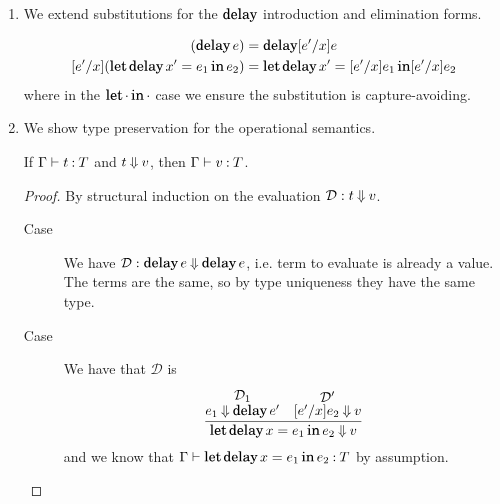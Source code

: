 \documentclass[11pt,letterpaper]{article}
\DeclareMathOperator{\LetOp}{\mathqd{let}}
\DeclareMathOperator{\InOp}{\mathqd{in}}
\newcommand{\Let}[2]{\LetOp #1 \InOp #2}
\DeclareMathOperator{\DelayOp}{\mathqd{delay}}
\newcommand{\delay}{\DelayOp}
\DeclareMathOperator{\ForceOp}{\mathqd{force}}
\newcommand{\force}{\ForceOp}
\begin{document}
\begin{enumerate}
\begin{proof}
      Next suppose $\mathcal{D} : e \evalbig v$.
      We construct the following derivation.
      \begin{equation*}
        \infer{\Let{\delay x = \delay e}{x} \evalbig v}{
          \infer{\delay e \evalbig \delay e}{}
          &
          \infer[\text{ass.}]{e \evalbig v}{}
        }
      \end{equation*}
      Finally we would use a variant of the lemma from class to get to the
      unevaluated form $\force(\delay e)$.
    \end{proof}

  \item
    We extend substitutions for the $\delay$ introduction and elimination
    forms.

    \begin{align*}
      [e^\prime/x](\delay e) &= \delay [e^\prime/x]e \\
      [e^\prime/x](\Let{\delay x^\prime = e_1}{e_2})
        &= \Let{\delay x^\prime = [e^\prime/x]e_1}{[e^\prime/x]e_2}
    \end{align*}
    where in the $\Let{\cdot}{\cdot}$ case we ensure the substitution is
    capture-avoiding.

  \item
    We show type preservation for the operational semantics.

    \begin{prop}
      If $\Gamma \vdash t \mathbin{:} T$ and $t \mathbin{\Downarrow} v$,
      then $\Gamma \vdash v \mathbin{:} T$.
    \end{prop}

    \begin{proof}
      By structural induction on the evaluation $\mathcal{D} : t \mathbin{\Downarrow} v$.

      \begin{description}
        \item[Case]
          We have $\mathcal{D} : \delay e \evalbig \delay e$,
          i.e. term to evaluate is already a value.
          The terms are the same, so by type uniqueness they have the same
          type.

        \item[Case]
          We have that $\mathcal{D}$ is
          \begin{equation*}
            \infer{\Let{\delay x = e_1}{e_2} \evalbig v}{
              \deduce[\mathcal{D}_1]{e_1 \evalbig \delay e^\prime}{}
              &
              \deduce[\mathcal{D}^\prime]{[e^\prime/x]e_2 \evalbig v}{}
            }
          \end{equation*}
          and we know that
          $\Gamma \proves \Let{\delay x = e_1}{e_2} \hastype T$
          by assumption.


\end{description}
\end{proof}
\end{enumerate}
\end{document}
